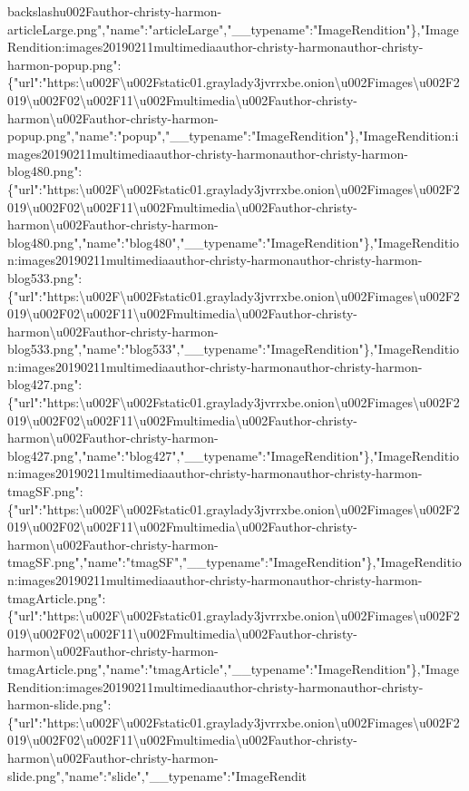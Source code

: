 backslash{}u002Fauthor-christy-harmon-articleLarge.png","name":"articleLarge","\_\_typename":"ImageRendition"\},"ImageRendition:images20190211multimediaauthor-christy-harmonauthor-christy-harmon-popup.png":\{"url":"https:\textbackslash{}u002F\textbackslash{}u002Fstatic01.graylady3jvrrxbe.onion\textbackslash{}u002Fimages\textbackslash{}u002F2019\textbackslash{}u002F02\textbackslash{}u002F11\textbackslash{}u002Fmultimedia\textbackslash{}u002Fauthor-christy-harmon\textbackslash{}u002Fauthor-christy-harmon-popup.png","name":"popup","\_\_typename":"ImageRendition"\},"ImageRendition:images20190211multimediaauthor-christy-harmonauthor-christy-harmon-blog480.png":\{"url":"https:\textbackslash{}u002F\textbackslash{}u002Fstatic01.graylady3jvrrxbe.onion\textbackslash{}u002Fimages\textbackslash{}u002F2019\textbackslash{}u002F02\textbackslash{}u002F11\textbackslash{}u002Fmultimedia\textbackslash{}u002Fauthor-christy-harmon\textbackslash{}u002Fauthor-christy-harmon-blog480.png","name":"blog480","\_\_typename":"ImageRendition"\},"ImageRendition:images20190211multimediaauthor-christy-harmonauthor-christy-harmon-blog533.png":\{"url":"https:\textbackslash{}u002F\textbackslash{}u002Fstatic01.graylady3jvrrxbe.onion\textbackslash{}u002Fimages\textbackslash{}u002F2019\textbackslash{}u002F02\textbackslash{}u002F11\textbackslash{}u002Fmultimedia\textbackslash{}u002Fauthor-christy-harmon\textbackslash{}u002Fauthor-christy-harmon-blog533.png","name":"blog533","\_\_typename":"ImageRendition"\},"ImageRendition:images20190211multimediaauthor-christy-harmonauthor-christy-harmon-blog427.png":\{"url":"https:\textbackslash{}u002F\textbackslash{}u002Fstatic01.graylady3jvrrxbe.onion\textbackslash{}u002Fimages\textbackslash{}u002F2019\textbackslash{}u002F02\textbackslash{}u002F11\textbackslash{}u002Fmultimedia\textbackslash{}u002Fauthor-christy-harmon\textbackslash{}u002Fauthor-christy-harmon-blog427.png","name":"blog427","\_\_typename":"ImageRendition"\},"ImageRendition:images20190211multimediaauthor-christy-harmonauthor-christy-harmon-tmagSF.png":\{"url":"https:\textbackslash{}u002F\textbackslash{}u002Fstatic01.graylady3jvrrxbe.onion\textbackslash{}u002Fimages\textbackslash{}u002F2019\textbackslash{}u002F02\textbackslash{}u002F11\textbackslash{}u002Fmultimedia\textbackslash{}u002Fauthor-christy-harmon\textbackslash{}u002Fauthor-christy-harmon-tmagSF.png","name":"tmagSF","\_\_typename":"ImageRendition"\},"ImageRendition:images20190211multimediaauthor-christy-harmonauthor-christy-harmon-tmagArticle.png":\{"url":"https:\textbackslash{}u002F\textbackslash{}u002Fstatic01.graylady3jvrrxbe.onion\textbackslash{}u002Fimages\textbackslash{}u002F2019\textbackslash{}u002F02\textbackslash{}u002F11\textbackslash{}u002Fmultimedia\textbackslash{}u002Fauthor-christy-harmon\textbackslash{}u002Fauthor-christy-harmon-tmagArticle.png","name":"tmagArticle","\_\_typename":"ImageRendition"\},"ImageRendition:images20190211multimediaauthor-christy-harmonauthor-christy-harmon-slide.png":\{"url":"https:\textbackslash{}u002F\textbackslash{}u002Fstatic01.graylady3jvrrxbe.onion\textbackslash{}u002Fimages\textbackslash{}u002F2019\textbackslash{}u002F02\textbackslash{}u002F11\textbackslash{}u002Fmultimedia\textbackslash{}u002Fauthor-christy-harmon\textbackslash{}u002Fauthor-christy-harmon-slide.png","name":"slide","\_\_typename":"ImageRendit